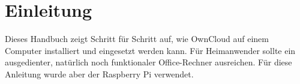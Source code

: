 \section{Einleitung}
Dieses Handbuch zeigt Schritt für Schritt auf, wie OwnCloud auf einem Computer installiert und eingesetzt werden kann.
Für Heimanwender sollte ein ausgedienter, natürlich noch funktionaler Office-Rechner ausreichen. Für diese Anleitung wurde aber der Raspberry Pi verwendet.


